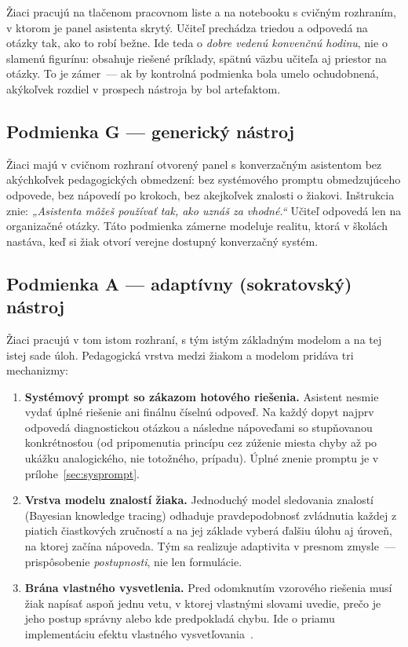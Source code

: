 Žiaci pracujú na tlačenom pracovnom liste a na notebooku s cvičným rozhraním, v ktorom je panel asistenta skrytý. Učiteľ prechádza triedou a odpovedá na otázky tak, ako to robí bežne. Ide teda o \emph{dobre vedenú konvenčnú hodinu}, nie o slamenú figurínu: obsahuje riešené príklady, spätnú väzbu učiteľa aj priestor na otázky. To je zámer~--- ak by kontrolná podmienka bola umelo ochudobnená, akýkoľvek rozdiel v prospech nástroja by bol artefaktom.

\subsection{Podmienka G --- generický nástroj}

Žiaci majú v cvičnom rozhraní otvorený panel s konverzačným asistentom bez akýchkoľvek pedagogických obmedzení: bez systémového promptu obmedzujúceho odpovede, bez nápovedí po krokoch, bez akejkoľvek znalosti o žiakovi. Inštrukcia znie: \emph{„Asistenta môžeš používať tak, ako uznáš za vhodné.“} Učiteľ odpovedá len na organizačné otázky. Táto podmienka zámerne modeluje realitu, ktorá v školách nastáva, keď si žiak otvorí verejne dostupný konverzačný systém.

\subsection{Podmienka A --- adaptívny (sokratovský) nástroj}

Žiaci pracujú v tom istom rozhraní, s tým istým základným modelom a na tej istej sade úloh. Pedagogická vrstva medzi žiakom a modelom pridáva tri mechanizmy:

\begin{enumerate}[nosep]
    \item \textbf{Systémový prompt so zákazom hotového riešenia.} Asistent nesmie vydať úplné riešenie ani finálnu číselnú odpoveď. Na každý dopyt najprv odpovedá diagnostickou otázkou a následne nápoveďami so stupňovanou konkrétnosťou (od pripomenutia princípu cez zúženie miesta chyby až po ukážku analogického, nie totožného, prípadu). Úplné znenie promptu je v prílohe~\ref{sec:sysprompt}.
    \item \textbf{Vrstva modelu znalostí žiaka.} Jednoduchý model sledovania znalostí (Bayesian knowledge tracing) odhaduje pravdepodobnosť zvládnutia každej z piatich čiastkových zručností a na jej základe vyberá ďalšiu úlohu aj úroveň, na ktorej začína nápoveda. Tým sa realizuje adaptivita v presnom zmysle~--- prispôsobenie \emph{postupnosti}, nie len formulácie.
    \item \textbf{Brána vlastného vysvetlenia.} Pred odomknutím vzorového riešenia musí žiak napísať aspoň jednu vetu, v ktorej vlastnými slovami uvedie, prečo je jeho postup správny alebo kde predpokladá chybu. Ide o priamu implementáciu efektu vlastného vysvetľovania~\cite{fiorella2016generative,chi2014icap}.
\end{enumerate}

